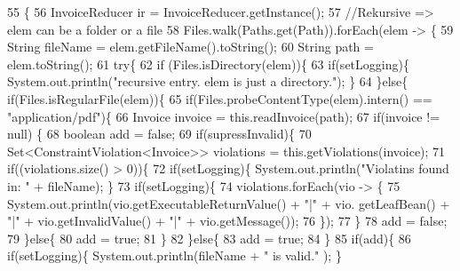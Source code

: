 \begin{DoxyCode}
55     \{
56         InvoiceReducer ir = InvoiceReducer.getInstance();
57         \textcolor{comment}{//Rekursive => elem can be a folder or a file }
58         Files.walk(Paths.get(Path)).forEach(elem -> \{
59             String fileName = elem.getFileName().toString();
60             String path = elem.toString();
61             \textcolor{keywordflow}{try}\{
62                 \textcolor{keywordflow}{if} (Files.isDirectory(elem))\{
63                     \textcolor{keywordflow}{if}(setLogging)\{ System.out.println(\textcolor{stringliteral}{"recursive entry. elem is just a directory."}); \}
64                 \}\textcolor{keywordflow}{else}\{  \textcolor{keywordflow}{if}(Files.isRegularFile(elem))\{
65                     \textcolor{keywordflow}{if}(Files.probeContentType(elem).intern() == \textcolor{stringliteral}{"application/pdf"})\{
66                         Invoice invoice = this.readInvoice(path);
67                         \textcolor{keywordflow}{if}(invoice != null) \{
68                             \textcolor{keywordtype}{boolean} add = \textcolor{keyword}{false};
69                             \textcolor{keywordflow}{if}(supressInvalid)\{
70                                 Set<ConstraintViolation<Invoice>> violations = this.getViolations(invoice);
71                                 \textcolor{keywordflow}{if}((violations.size() > 0))\{
72                                     \textcolor{keywordflow}{if}(setLogging)\{ System.out.println(\textcolor{stringliteral}{"Violatins found in: "} + fileName); 
      \}
73                                     \textcolor{keywordflow}{if}(setLogging)\{ 
74                                         violations.forEach(vio -> \{
75                                             System.out.println(vio.getExecutableReturnValue() + \textcolor{stringliteral}{"|"} + vio.
      getLeafBean() + \textcolor{stringliteral}{"|"} + vio.getInvalidValue() + \textcolor{stringliteral}{"|"} + vio.getMessage());
76                                         \});
77                                     \}
78                                     add = \textcolor{keyword}{false};
79                                 \}\textcolor{keywordflow}{else}\{
80                                     add = \textcolor{keyword}{true};
81                                 \}
82                             \}\textcolor{keywordflow}{else}\{
83                                 add = \textcolor{keyword}{true};
84                             \}
85                             \textcolor{keywordflow}{if}(add)\{
86                                 \textcolor{keywordflow}{if}(setLogging)\{ System.out.println(fileName + \textcolor{stringliteral}{" is valid."} ); \}

\end{DoxyCode}
